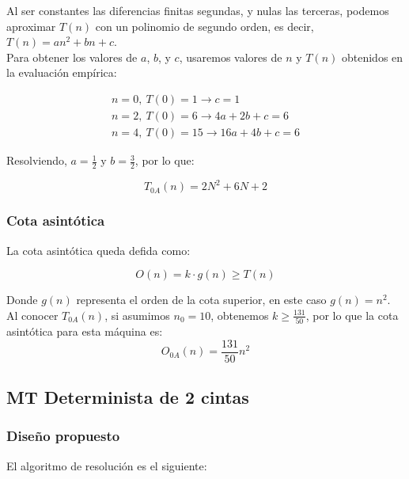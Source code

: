 Al ser constantes las diferencias finitas segundas, y nulas las terceras, podemos aproximar $T(n)$ con un polinomio de segundo orden, es decir, $T(n) = an^2 + bn + c$.\\

Para obtener los valores de $a$, $b$, y $c$, usaremos valores de $n$ y $T(n)$ obtenidos en la evaluación empírica:

\begin{subequations}
    \begin{gather}
        n = 0,\ T(0) = 1 \rightarrow c = 1 \\
        n = 2,\ T(0) = 6 \rightarrow 4a + 2b + c = 6 \\
        n = 4,\ T(0) = 15 \rightarrow 16a + 4b + c = 6
    \end{gather}
\end{subequations}

Resolviendo, $a=\frac{1}{2}$ y $b=\frac{3}{2}$, por lo que:

\begin{equation}
    T_{0A}(n) = 2N^2 + 6N + 2
\end{equation}


\subsubsection*{Cota asintótica}

La cota asintótica queda defida como:

\begin{equation}
    O(n) = k \cdot g(n) \geq T(n)
\end{equation}

Donde $g(n)$ representa el orden de la cota superior, en este caso $g(n) = n^2$.\\

Al conocer $T_{0A}(n)$, si asumimos $n_0 = 10$, obtenemos $k \geq \frac{131}{50}$, por lo que la cota asintótica para esta máquina es:
\begin{equation}
    O_{0A}(n) = \frac{131}{50} n^2
\end{equation}




\subsection{MT Determinista de 2 cintas}

\subsubsection*{Diseño propuesto}
El algoritmo de resolución es el siguiente:

